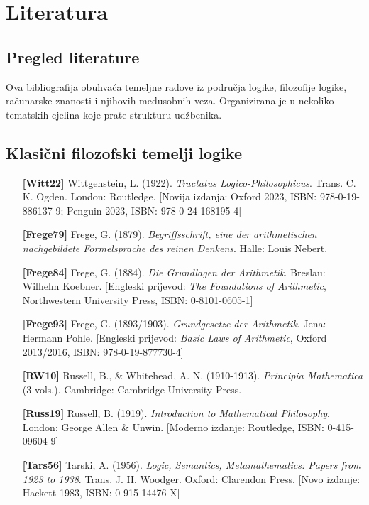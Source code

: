 \chapter{Literatura}
\label{ch:literatura}

\section*{Pregled literature}

Ova bibliografija obuhvaća temeljne radove iz područja logike, filozofije logike, računarske znanosti i njihovih međusobnih veza. Organizirana je u nekoliko tematskih cjelina koje prate strukturu udžbenika.


\section{Klasični filozofski temelji logike}

\begin{itemize}[leftmargin=2cm, labelsep=0.5cm, itemsep=0.3cm]

\item[\textbf{[Witt22]}] Wittgenstein, L. (1922). \textit{Tractatus Logico-Philosophicus}. Trans. C. K. Ogden. London: Routledge. [Novija izdanja: Oxford 2023, ISBN: 978-0-19-886137-9; Penguin 2023, ISBN: 978-0-24-168195-4]

\item[\textbf{[Frege79]}] Frege, G. (1879). \textit{Begriffsschrift, eine der arithmetischen nachgebildete Formelsprache des reinen Denkens}. Halle: Louis Nebert.

\item[\textbf{[Frege84]}] Frege, G. (1884). \textit{Die Grundlagen der Arithmetik}. Breslau: Wilhelm Koebner. [Engleski prijevod: \textit{The Foundations of Arithmetic}, Northwestern University Press, ISBN: 0-8101-0605-1]

\item[\textbf{[Frege93]}] Frege, G. (1893/1903). \textit{Grundgesetze der Arithmetik}. Jena: Hermann Pohle. [Engleski prijevod: \textit{Basic Laws of Arithmetic}, Oxford 2013/2016, ISBN: 978-0-19-877730-4]

\item[\textbf{[RW10]}] Russell, B., \& Whitehead, A. N. (1910-1913). \textit{Principia Mathematica} (3 vols.). Cambridge: Cambridge University Press.

\item[\textbf{[Russ19]}] Russell, B. (1919). \textit{Introduction to Mathematical Philosophy}. London: George Allen \& Unwin. [Moderno izdanje: Routledge, ISBN: 0-415-09604-9]

\item[\textbf{[Tars56]}] Tarski, A. (1956). \textit{Logic, Semantics, Metamathematics: Papers from 1923 to 1938}. Trans. J. H. Woodger. Oxford: Clarendon Press. [Novo izdanje: Hackett 1983, ISBN: 0-915-14476-X]

\end{itemize}

